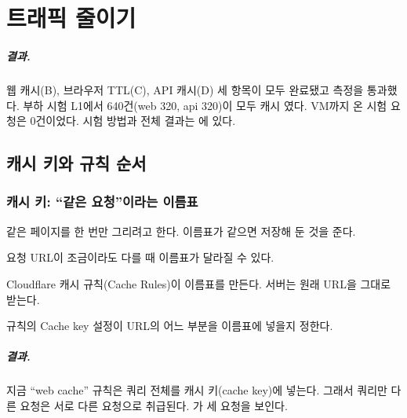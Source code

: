 \chapter{트래픽 줄이기}\label{ch:reduce-traffic}

\paragraph{결과.}
웹 캐시(B), 브라우저 TTL(C), API 캐시(D) 세 항목이 모두 완료됐고 측정을 통과했다.
부하 시험 L1에서 640건(web 320, api 320)이 모두 캐시 였다.
VM까지 온 시험 요청은 0건이었다.
시험 방법과 전체 결과는 에 있다.

\section{캐시 키와 규칙 순서}\label{sec:rt-concepts}

\subsection{캐시 키: ``같은 요청''이라는 이름표}\label{sec:rt-key}

\begin{inbrief}
  \item[Why] 같은 페이지를 한 번만 그리려고 한다. 이름표가 같으면 저장해 둔 것을 준다.
  \item[When] 요청 URL이 조금이라도 다를 때 이름표가 달라질 수 있다.
  \item[Where] Cloudflare 캐시 규칙(Cache Rules)이 이름표를 만든다. 서버는 원래 URL을 그대로 받는다.
  \item[How] 규칙의 Cache key 설정이 URL의 어느 부분을 이름표에 넣을지 정한다.
\end{inbrief}

\paragraph{결과.}
지금 ``web cache'' 규칙은 쿼리 전체를 캐시 키(cache key)에 넣는다.
그래서 쿼리만 다른 요청은 서로 다른 요청으로 취급된다.
가 세 요청을 보인다.

